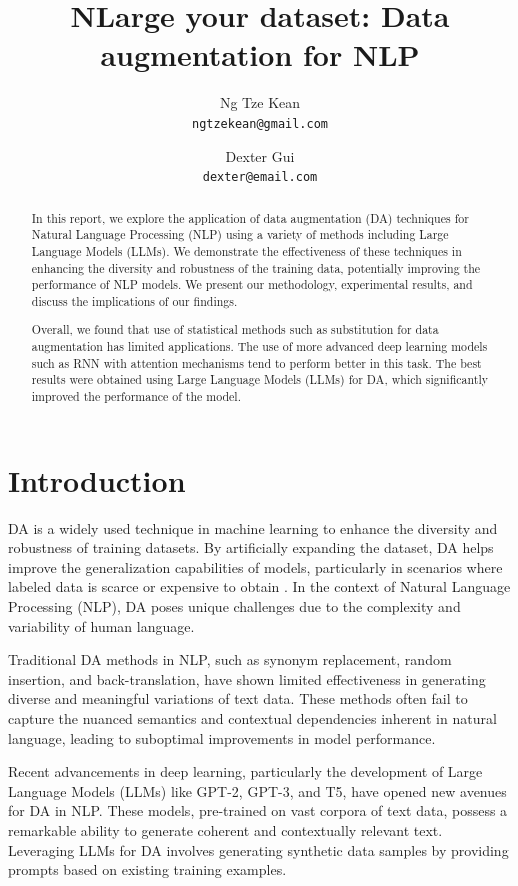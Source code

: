 \documentclass{article}
\title{NLarge your dataset: Data augmentation for NLP}
\author{
  Ng Tze Kean \\
  \texttt{ngtzekean@gmail.com}
  \and
  Dexter Gui \\
  \texttt{dexter@email.com}
}
\begin{document}
\maketitle

\begin{abstract}

  In this report, we explore the application of data augmentation (DA) techniques
  for Natural Language Processing (NLP) using a variety of methods including
  Large Language Models (LLMs). We demonstrate the effectiveness of these
  techniques in enhancing the diversity and robustness of the training data,
  potentially improving the performance of NLP models. We present our
  methodology, experimental results, and discuss the implications of our
  findings.

  Overall, we found that use of statistical methods such as substitution for data
  augmentation has limited applications. The use of more advanced deep learning
  models such as RNN with attention mechanisms tend to perform better in this
  task. The best results were obtained using Large Language Models (LLMs) for DA,
  which significantly improved the performance of the model.

\end{abstract}

\section{Introduction}

DA is a widely used technique in machine learning to enhance the diversity and
robustness of training datasets. By artificially expanding the dataset, DA
helps improve the generalization capabilities of models, particularly in
scenarios where labeled data is scarce or expensive to obtain
\cite{DBLP:journals/corr/abs-2105-03075}. In the context of Natural Language
Processing (NLP), DA poses unique challenges due to the complexity and
variability of human language.

Traditional DA methods in NLP, such as synonym replacement, random insertion,
and back-translation, have shown limited effectiveness in generating diverse
and meaningful variations of text data. These methods often fail to capture the
nuanced semantics and contextual dependencies inherent in natural language,
leading to suboptimal improvements in model performance.

Recent advancements in deep learning, particularly the development of Large
Language Models (LLMs) like GPT-2, GPT-3, and T5, have opened new avenues for
DA in NLP. These models, pre-trained on vast corpora of text data, possess a
remarkable ability to generate coherent and contextually relevant text.
Leveraging LLMs for DA involves generating synthetic data samples by providing
prompts based on existing training examples.
\end{document}
